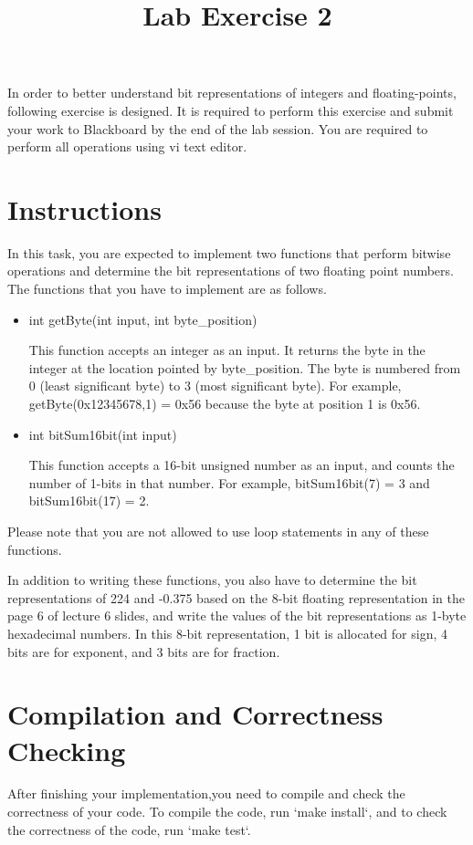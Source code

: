 \documentclass[twoside,11pt]{article}
\newcommand\assignmentNumber{2}
\begin{document}
    \title{Lab Exercise \assignmentNumber}
    \maketitle
In order to better understand bit representations of integers and floating-points, following exercise is designed. It is required to perform this exercise and submit your work to Blackboard by the end of the lab session. You are required to perform all operations using vi text editor.

\section{Instructions}

In this task, you are expected to implement two functions that perform bitwise operations and 
determine the bit representations of two floating point numbers. The functions that you have to 
implement are as follows.

\begin{itemize}
\item int getByte(int input, int byte_position)

This function accepts an integer as an input. It returns the byte in the integer at the location pointed by byte_position. The byte is numbered from 0 (least significant byte) to 3 (most significant byte). For example, getByte(0x12345678,1) = 0x56 because the byte at position 1 is 0x56.

\item int bitSum16bit(int input)

This function accepts a 16-bit unsigned number as an input, and counts the number of 1-bits in 
that number. For example, bitSum16bit(7) = 3 and bitSum16bit(17) = 2.

\end{itemize}

Please note that you are not allowed to use loop statements in any of these functions. 

In addition to writing these functions, you also have to determine the bit representations of 
224 and -0.375 based on the 8-bit floating representation in the page 6 of lecture 6 slides, 
and write the values of the bit representations as 1-byte hexadecimal numbers. In this 8-bit 
representation, 1 bit is allocated for sign, 4 bits are for exponent, and 3 bits are for fraction.

\section{Compilation and Correctness Checking}

After finishing your implementation,you need to compile and check the correctness of your code. To compile the code, run `make install`, and to check the correctness of the code, run `make test`.

\newpage
\end{document}
